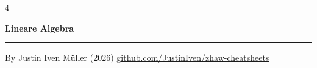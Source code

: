 \documentclass[10pt,landscape]{article}
\begin{document}

\begin{multicols*}{4}

\begin{center}
     \Large{\textbf{Lineare Algebra}} \\
\end{center}










\vfill

\rule{0.3\linewidth}{0.25pt}
\scriptsize

By Justin Iven Müller (2026)
\href{https://github.com/JustinIven/zhaw-cheatsheets}{github.com/JustinIven/zhaw-cheatsheets}


\end{multicols*}
\end{document}
